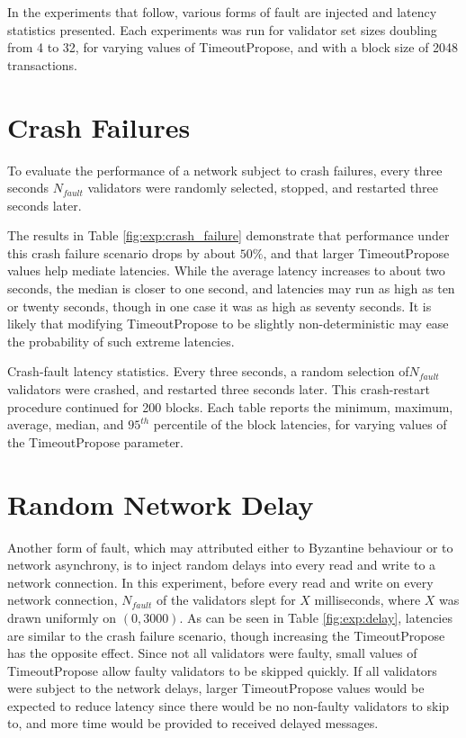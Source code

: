 In the experiments that follow, various forms of fault are injected
and latency statistics presented.
Each experiments was run for validator set sizes doubling from 4 to 32, 
for varying values of TimeoutPropose, and with a block size of 2048 transactions.

\section{Crash Failures}

To evaluate the performance of a network subject to crash failures, 
every three seconds $N_{fault}$ validators were randomly selected,
stopped, and restarted three seconds later.

The results in Table \ref{fig:exp:crash_failure} demonstrate that 
performance under this crash failure scenario drops by about 
$50\%$, and that larger TimeoutPropose values help mediate latencies. 
While the average latency increases to about two seconds,
the median is closer to one second, and latencies may run as high as ten or twenty seconds,
though in one case it was as high as seventy seconds.
It is likely that modifying TimeoutPropose to be slightly non-deterministic may
ease the probability of such extreme latencies.

\begin{table}
	
	\caption[Latency statistics under crash faults]{Crash-fault latency statistics. Every three seconds, a random selection of$N_{fault}$ validators were crashed, and restarted three seconds later. This crash-restart procedure continued for 200 blocks. Each table reports the minimum, maximum, average, median, and $95^{th}$ percentile of the block latencies, for varying values of the TimeoutPropose parameter.}
	\label{fig:exp:crash_failure}
\end{table}

\section{Random Network Delay}

Another form of fault, which may attributed either to Byzantine behaviour or to network asynchrony,
is to inject random delays into every read and write to a network connection.
In this experiment, before every read and write on every network connection,
$N_{fault}$ of the validators slept for $X$ milliseconds, 
where $X$ was drawn uniformly on $(0, 3000)$.
As can be seen in Table \ref{fig:exp:delay}, 
latencies are similar to the crash failure scenario, 
though increasing the TimeoutPropose has the opposite effect.
Since not all validators were faulty, 
small values of TimeoutPropose allow faulty validators to be skipped quickly. 
If all validators were subject to the network delays, 
larger TimeoutPropose values would be expected to reduce latency
since there would be no non-faulty validators to skip to,
and more time would be provided to received delayed messages.

